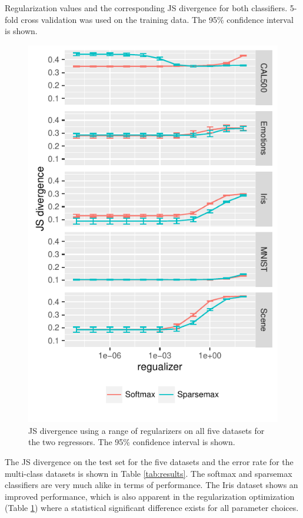 \begin{table}[H]
\centering

\caption{Regularization values and the corresponding JS divergence for both classifiers. 5-fold cross validation was used on the training data. The 95\% confidence interval is shown.}
\label{tab:hyperparameters}
\end{table}
\begin{figure}[H]
	\centering
	\includegraphics[scale=1]{figures/hyperparameter.pdf}
\caption{JS divergence using a range of regularizers on all five datasets for the two regressors. The 95\% confidence interval is shown.}
\label{fig:hyperparameters}
\end{figure}

The JS divergence on the test set for the five datasets and the error rate for the multi-class datasets is shown in Table \ref{tab:results}. The softmax and sparsemax classifiers are very much alike in terms of performance. The Iris dataset shows an improved performance, which is also apparent in the regularization optimization (Table \ref{fig:hyperparameters}) where a statistical significant difference exists for all parameter choices.

